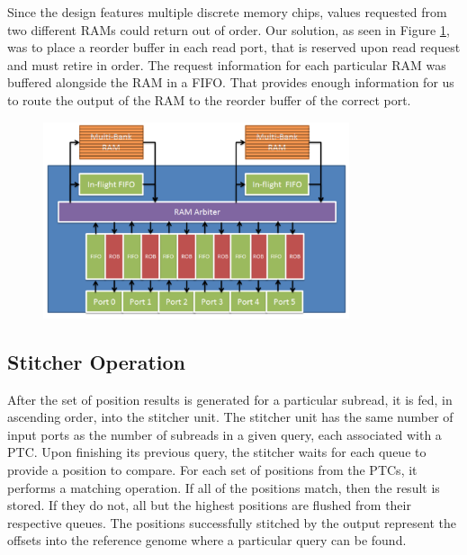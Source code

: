 \documentclass[11pt]{article}
\begin{document}
Since the design features multiple discrete memory chips, values requested from two different RAMs could return out of order.   Our solution, as seen in Figure \ref{rammodel}, was to place a reorder buffer in each read port, that is reserved upon read request and must retire in order.  The request information for each particular RAM was buffered alongside the RAM in a FIFO.  That provides enough information for us to route the output of the RAM to the reorder buffer of the correct port.  
\begin{figure}[ht!]
\centering
\includegraphics[width=90mm]{rammodel.png}
\caption{}
\label{rammodel}
\end{figure}

\subsection{Stitcher Operation}
After the set of position results is generated for a particular subread, it is fed, in ascending order, into the stitcher unit.  The stitcher unit has the same number of input ports as the number of subreads in a given query, each associated with a PTC.  Upon finishing its previous query, the stitcher waits for each queue to provide a position to compare.  For each set of positions from the PTCs, it performs a matching operation.  If all of the positions match, then the result is stored.  If they do not, all but the highest positions are flushed from their respective queues.  The positions successfully stitched by the output represent the offsets into the reference genome where a particular query can be found.
\end{document}
